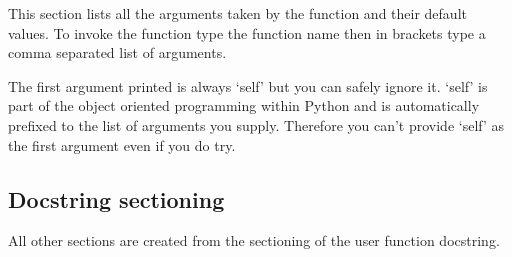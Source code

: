 This section lists all the arguments taken by the function and their default values.  To invoke the function type the function name then in brackets type a comma separated list of arguments.

The first argument printed is always `self' but you can safely ignore it.  `self' is part of the object oriented programming within Python and is automatically prefixed to the list of arguments you supply.  Therefore you can't provide `self' as the first argument even if you do try.


\subsection{Docstring sectioning}

All other sections are created from the sectioning of the user function docstring.


\newpage
\begin{multicols}{2}
{\scriptsize

}
\end{multicols}
